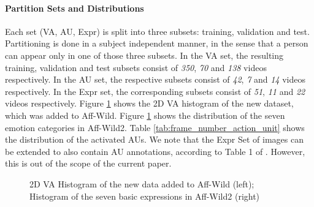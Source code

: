 \documentclass{bmvc2k}
\begin{document}
\paragraph{Partition Sets and Distributions} 
 \vskip-0.6cm
Each set (VA, AU, Expr) is split into three subsets: training, validation and test. Partitioning is done in a subject independent manner, in the sense that a person can  appear  only  in  one  of  those  three  subsets. In the VA set, the  resulting  training, validation and test subsets consist of \textit{350}, \textit{70} and \textit{138} videos respectively. In the AU set, the  respective  subsets consist of \textit{42}, \textit{7} and  \textit{14} videos respectively. In the Expr set, the  corresponding subsets consist of \textit{51}, \textit{11} and \textit{22} videos respectively.
Figure \ref{tab:frame_number_basic_expr} shows the 2D VA histogram of the new dataset, which was added to Aff-Wild.
Figure \ref{tab:frame_number_basic_expr} shows the distribution of the seven emotion categories in Aff-Wild2. Table \ref{tab:frame_number_action_unit} shows the distribution of the activated AUs. We note that the Expr Set of images can be extended to also contain AU annotations, according to Table 1 of \cite{du2014compound}. However, this is out of the scope of the current paper. 









\begin{figure}[h]
\centering
{}
\caption{2D VA Histogram of the new data added to Aff-Wild (left); Histogram of the seven basic expressions in Aff-Wild2 (right)}
\label{tab:frame_number_basic_expr}
\end{figure}
\end{document}
